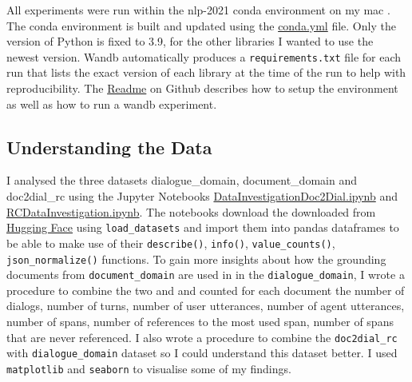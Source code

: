 \documentclass[11pt]{article}
\begin{document}
    All experiments were run within the nlp-2021 conda environment on my mac \cite{conda_forge_community_2015_4774216}.
    The conda environment is built and updated using the
    \href{https://github.com/isabelladegen/nlp-2021/blob/main/conda.yml}{conda.yml} file. Only the version of Python is
    fixed to 3.9, for the other libraries I wanted to use the newest version. Wandb \cite{wandb} automatically produces
    a \texttt{requirements.txt}
    file for each run that lists the exact version of each library at the time of the run to help with reproducibility. The
    \href{https://github.com/isabelladegen/nlp-2021}{Readme} on Github describes how to setup the environment as well
    as how to run a wandb experiment.

    \subsection{Understanding the Data}\label{subsec:understanding-the-data-experiment}
    I analysed the three datasets dialogue\_domain, document\_domain and doc2dial\_rc using the Jupyter Notebooks
    \href{https://github.com/isabelladegen/nlp-2021/blob/main/notebooks/DataInvestigationDoc2Dial.ipynb}{DataInvestigationDoc2Dial.ipynb}
    and \href{https://github.com/isabelladegen/nlp-2021/blob/main/notebooks/RCDataInvestigation.ipynb}{RCDataInvestigation.ipynb}.
    The notebooks download the downloaded from \href{https://huggingface.co/datasets/doc2dial}{Hugging Face}
    using \texttt{load\_datasets} and import them into pandas dataframes \cite{reback2020pandas} to be able to make use of their
    \texttt{describe()}, \texttt{info()}, \texttt{value\_counts()}, \texttt{json\_normalize()} functions. To gain more insights
    about how the grounding documents from \texttt{document\_domain} are used in in the \texttt{dialogue\_domain},
    I wrote a procedure to combine the two and and counted for each document the number of dialogs, number of turns, number of user utterances,
    number of agent utterances, number of spans, number of references to the most used span, number of spans that are never referenced.
    I also wrote a procedure to combine the \texttt{doc2dial\_rc} with \texttt{dialogue\_domain} dataset so I could understand
    this dataset better. I used \texttt{matplotlib} \cite{matplotlib} and \texttt{seaborn} \cite{seaborn} to visualise
    some of my findings.
\end{document}
